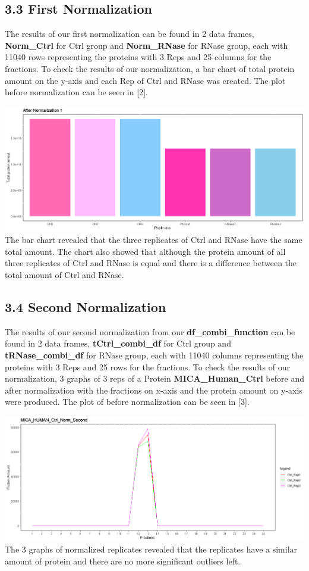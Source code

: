 \documentclass[
]{article}
\begin{document}
\hypertarget{first-normalization}{%
\subsection{3.3 First Normalization}\label{first-normalization}}

The results of our first normalization can be found in 2 data frames,
\textbf{Norm\_Ctrl} for Ctrl group and \textbf{Norm\_RNase} for RNase
group, each with 11040 rows representing the proteins with 3 Reps and 25
columns for the fractions. To check the results of our normalization, a
bar chart of total protein amount on the y-axis and each Rep of Ctrl and
RNase was created. The plot before normalization can be seen in {[}2{]}.

\includegraphics{../results/png/After_Norm_1.png} The bar chart revealed
that the three replicates of Ctrl and RNase have the same total amount.
The chart also showed that although the protein amount of all three
replicates of Ctrl and RNase is equal and there is a difference between
the total amount of Ctrl and RNase.

\hypertarget{second-normalization}{%
\subsection{3.4 Second Normalization}\label{second-normalization}}

The results of our second normalization from our
\textbf{df\_combi\_function} can be found in 2 data frames,
\textbf{tCtrl\_combi\_df} for Ctrl group and \textbf{tRNase\_combi\_df}
for RNase group, each with 11040 columns representing the proteins with
3 Reps and 25 rows for the fractions. To check the results of our
normalization, 3 graphs of 3 reps of a Protein
\textbf{MICA\_Human\_Ctrl} before and after normalization with the
fractions on x-axis and the protein amount on y-axis were produced. The
plot of before normalization can be seen in {[}3{]}.

\includegraphics{../results/png/After_Norm_2.png} The 3 graphs of
normalized replicates revealed that the replicates have a similar amount
of protein and there are no more significant outliers left.
\end{document}

